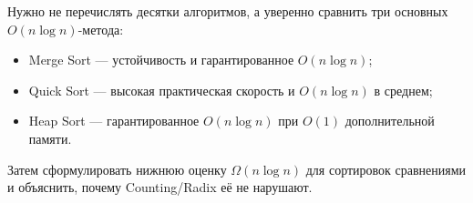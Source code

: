 Нужно не перечислять десятки алгоритмов, а уверенно сравнить три основных $O(n\log n)$-метода:
\begin{itemize}
\item Merge Sort --- устойчивость и гарантированное $O(n\log n)$;
\item Quick Sort --- высокая практическая скорость и $O(n\log n)$ в среднем;
\item Heap Sort --- гарантированное $O(n\log n)$ при $O(1)$ дополнительной памяти.
\end{itemize}
Затем сформулировать нижнюю оценку $\Omega(n\log n)$ для сортировок сравнениями и объяснить, почему Counting/Radix её не нарушают.

\newpage
